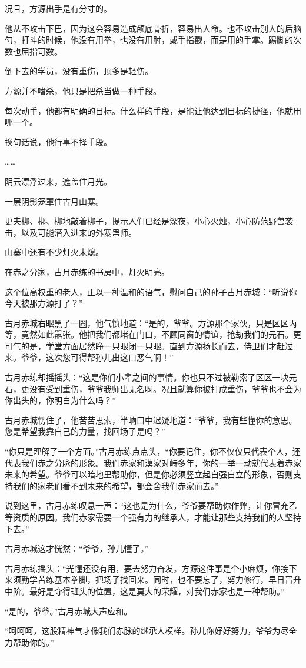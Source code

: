 \begin{this_body}
况且，方源出手是有分寸的。

他从不攻击下巴，因为这会容易造成颅底骨折，容易出人命。也不攻击别人的后脑勺，打斗的时候，他没有用拳，也没有用肘，或手指戳，而是用的手掌。踢脚的次数也屈指可数。

倒下去的学员，没有重伤，顶多是轻伤。

方源并不嗜杀，他只是把杀当做一种手段。

每次动手，他都有明确的目标。什么样的手段，是能让他达到目标的捷径，他就用哪一个。

换句话说，他行事不择手段。

……

阴云漂浮过来，遮盖住月光。

一层阴影笼罩住古月山寨。

更夫梆、梆、梆地敲着梆子，提示人们已经是深夜，小心火烛，小心防范野兽袭击，以及可能潜入进来的外寨蛊师。

山寨中还有不少灯火未熄。

在赤之分家，古月赤练的书房中，灯火明亮。

这个位高权重的老人，正以一种温和的语气，慰问自己的孙子古月赤城：“听说你今天被那方源打了？”

古月赤城右眼黑了一圈，他气愤地道：“是的，爷爷。方源那个家伙，只是区区丙等，竟然如此嚣张。他把我们都堵在门口，不顾同窗的情谊，抢劫我们的元石。更可气的是，学堂方面居然睁一只眼闭一只眼。直到方源扬长而去，侍卫们才赶过来。爷爷，这次您可得帮孙儿出这口恶气啊！”

古月赤练却摇摇头：“这是你们小辈之间的事情。你也只不过被勒索了区区一块元石，更没有受到重伤，爷爷我师出无名啊。况且就算你被打成重伤，爷爷也不会为你出头的，你明白为什么吗？”

古月赤城愣住了，他苦苦思索，半晌口中迟疑地道：“爷爷，我有些懂你的意思。您是希望我靠自己的力量，找回场子是吗？”

“你只是理解了一个方面。”古月赤练点点头，“你要记住，你不仅仅只代表个人，还代表我们赤之分脉的形象。我们赤家和漠家对峙多年，你的一举一动就代表着赤家未来的希望。爷爷可以暗地里帮助你，但是你必须竖立起自强自立的形象，否则支持我们的家老们看不到未来的希望，都会舍我们赤家而去。”

说到这里，古月赤练叹息一声：“这也是为什么，爷爷要帮助你作弊，让你冒充乙等资质的原因。我们赤家需要一个强有力的继承人，才能让那些支持我们的人坚持下去。”

古月赤城这才恍然：“爷爷，孙儿懂了。”

古月赤练摇头：“光懂还没有用，要去努力奋发。方源这件事是个小麻烦，你接下来须勤学苦练基本拳脚，把场子找回来。同时，也不要忘了，努力修行，早日晋升中阶。最好是夺得班头的位置，这是莫大的荣耀，对我们赤家也是一种帮助。”

“是的，爷爷。”古月赤城大声应和。

“呵呵呵，这股精神气才像我们赤脉的继承人模样。孙儿你好好努力，爷爷为尽全力帮助你的。”

------------

\end{this_body}

